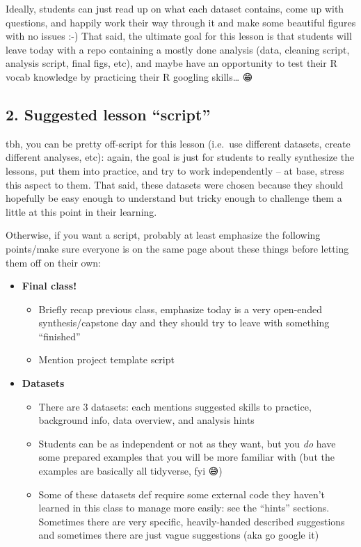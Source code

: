 \documentclass[
  letterpaper,
  DIV=11,
  numbers=noendperiod]{scrreprt}
\providecommand{\tightlist}{%
  \setlength{\itemsep}{0pt}\setlength{\parskip}{0pt}}\usepackage{longtable,booktabs,array}
\begin{document}
\begin{tcolorbox}
Ideally, students can just read up on what each dataset contains, come
up with questions, and happily work their way through it and make some
beautiful figures with no issues :-) That said, the ultimate goal for
this lesson is that students will leave today with a repo containing a
mostly done analysis (data, cleaning script, analysis script, final
figs, etc), and maybe have an opportunity to test their R vocab
knowledge by practicing their R googling skills\ldots{} 😁

\subsection{2. Suggested lesson ``script''}

tbh, you can be pretty off-script for this lesson (i.e.~use different
datasets, create different analyses, etc): again, the goal is just for
students to really synthesize the lessons, put them into practice, and
try to work independently -- at base, stress this aspect to them. That
said, these datasets were chosen because they should hopefully be easy
enough to understand but tricky enough to challenge them a little at
this point in their learning.

Otherwise, if you want a script, probably at least emphasize the
following points/make sure everyone is on the same page about these
things before letting them off on their own:

\begin{itemize}
\tightlist
\item
  \textbf{Final class!}

  \begin{itemize}
  \tightlist
  \item
    Briefly recap previous class, emphasize today is a very open-ended
    synthesis/capstone day and they should try to leave with something
    ``finished''
  \item
    Mention project template script
  \end{itemize}
\item
  \textbf{Datasets}

  \begin{itemize}
  \tightlist
  \item
    There are 3 datasets: each mentions suggested skills to practice,
    background info, data overview, and analysis hints
  \item
    Students can be as independent or not as they want, but you
    \emph{do} have some prepared examples that you will be more familiar
    with (but the examples are basically all tidyverse, fyi 😅)
  \item
    Some of these datasets def require some external code they haven't
    learned in this class to manage more easily: see the ``hints''
    sections. Sometimes there are very specific, heavily-handed
    described suggestions and sometimes there are just vague suggestions
    (aka go google it)
  \end{itemize}
\end{itemize}


\end{tcolorbox}
\end{document}
